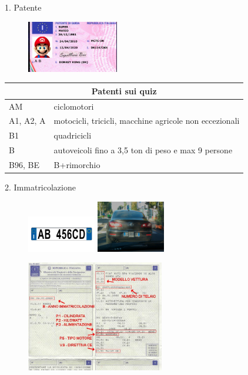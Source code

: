      
             
     
     
     
\begin{frame}{1. Patente}
	\begin{figure}[ht!]
    		\centering
         		\includegraphics[width = 4cm]{images/patente.jpg}
    	\end{figure}
    	\begin{center}
    	\begin{tabular}{ |p{2cm}|p{7.2cm}|}
 \hline
 \multicolumn{2}{|c|}{\textbf{ Patenti sui quiz}} \\
 \hline
AM & ciclomotori\\
A1, A2, A& motocicli, tricicli, macchine agricole non eccezionali\\
B1& quadricicli\\
B & autoveicoli fino a 3,5 ton di peso e  max 9 persone\\
B96, BE & B+rimorchio\\
 \hline
\end{tabular}
\end{center}
\end{frame}     
    
    
    
\begin{frame}{2. Immatricolazione}
	\begin{figure}[ht!]
    		\centering
         		\includegraphics[width = 3cm]{images/targa.jpg}
         		\hspace{1cm}
         		\includegraphics[width = 3cm]{images/targa_prova.jpg}
         		
         		\includegraphics[width = 6cm]{images/libretto.jpg} 		
    	\end{figure}
\end{frame}  
    
